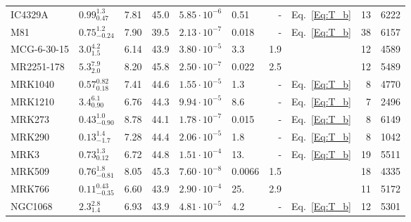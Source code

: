 \begin{footnotesize}
\begin{longtable}{llrrllrlrr}
IC4329A                &      $ 0.99_{0.47}^{1.3} $ &          7.81 &    45.0 & $5.85\cdot10^{-6}$ &         0.51 &        - &                    Eq.~\ref{Eq:T_b} &    13 &     6222 \\
M81                    &     $ 0.75_{-0.24}^{1.2} $ &          7.90 &    39.5 & $2.13\cdot10^{-7}$ &        0.018 &        - &                    Eq.~\ref{Eq:T_b} &    38 &     6157 \\
MCG-6-30-15            &        $ 3.0_{1.5}^{4.2} $ &          6.14 &    43.9 & $3.80\cdot10^{-5}$ &          3.3 &      1.9 &            {\citet{summons_thesis}} &    12 &     4589 \\
MR2251-178             &        $ 5.3_{2.0}^{7.9} $ &          8.20 &    45.8 & $2.50\cdot10^{-7}$ &        0.022 &      2.5 &            {\citet{summons_thesis}} &    12 &     5489 \\
MRK1040                &     $ 0.57_{0.18}^{0.82} $ &          7.41 &    44.6 & $1.55\cdot10^{-5}$ &          1.3 &        - &                    Eq.~\ref{Eq:T_b} &     8 &     4770 \\
MRK1210                &       $ 3.4_{0.90}^{6.1} $ &          6.76 &    44.3 & $9.94\cdot10^{-5}$ &          8.6 &        - &                    Eq.~\ref{Eq:T_b} &     7 &     2496 \\
MRK273                 &     $ 0.43_{-0.90}^{1.0} $ &          8.78 &    44.1 & $1.78\cdot10^{-7}$ &        0.015 &        - &                    Eq.~\ref{Eq:T_b} &     8 &     6149 \\
MRK290                 &      $ 0.13_{-1.7}^{1.4} $ &          7.28 &    44.4 & $2.06\cdot10^{-5}$ &          1.8 &        - &                    Eq.~\ref{Eq:T_b} &     8 &     1042 \\
MRK3                   &      $ 0.73_{0.12}^{1.3} $ &          6.72 &    44.8 & $1.51\cdot10^{-4}$ &          13. &        - &                    Eq.~\ref{Eq:T_b} &    19 &     5511 \\
MRK509                 &     $ 0.76_{-0.81}^{1.8} $ &          8.05 &    45.3 & $7.60\cdot10^{-8}$ &       0.0066 &      1.5 &            {\citet{summons_thesis}} &    18 &     4335 \\
MRK766                 &    $ 0.11_{-0.35}^{0.43} $ &          6.60 &    43.9 & $2.90\cdot10^{-4}$ &          25. &      2.9 &            {\citet{summons_thesis}} &    11 &     5172 \\
NGC1068                &        $ 2.3_{1.4}^{2.8} $ &          6.93 &    43.9 & $4.81\cdot10^{-5}$ &          4.2 &        - &                    Eq.~\ref{Eq:T_b} &    12 &     5301 \\

\end{longtable}
\end{footnotesize}
